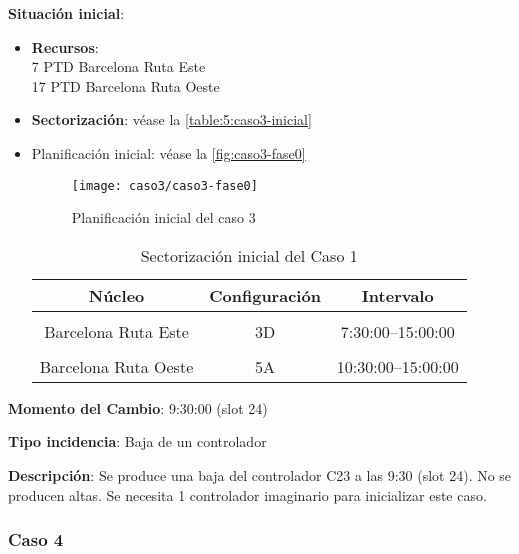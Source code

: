 \textbf{Situación inicial}:
\begin{itemize}[label={}]
	
	\item \textbf{Recursos}: \\
	7 PTD Barcelona Ruta Este \\
	17 PTD Barcelona Ruta Oeste
	
	
	\item \textbf{Sectorización}: véase la \autoref{table:5:caso3-inicial}
	
	\item Planificación inicial: véase la \autoref{fig:caso3-fase0}
	
	\begin{figure}[!h]
		\centering
		\texttt{[image: caso3/caso3-fase0]}
		\caption{Planificación inicial del caso 3}
		\label{fig:caso3-fase0}
	\end{figure}

	\begin{table}[h]
		\centering
		\caption{Sectorización inicial del Caso 1}
		\begin{tabular}{ccc}
			\hline
			\textbf{Núcleo}      & \textbf{Configuración} & \textbf{Intervalo}   \\ \hline
			\multicolumn{1}{l}{} & \multicolumn{1}{l}{}   & \multicolumn{1}{l}{} \\
			Barcelona Ruta Este  & 3D                     & 7:30:00--15:00:00    \\
			\multicolumn{1}{l}{} & \multicolumn{1}{l}{}   & \multicolumn{1}{l}{} \\
			Barcelona Ruta Oeste & 5A                     & 10:30:00--15:00:00   \\ \hline
		\end{tabular}
		\label{table:5:caso3-inicial}
	\end{table}
	
\end{itemize}

\textbf{Momento del Cambio}: 9:30:00 (slot 24) %

\textbf{Tipo incidencia}: Baja de un controlador

\textbf{Descripción}: Se produce una baja del controlador C23 a las 9:30 (slot 24). No se producen altas. Se necesita 1 controlador imaginario para inicializar este caso.


\subsubsection{Caso 4}

